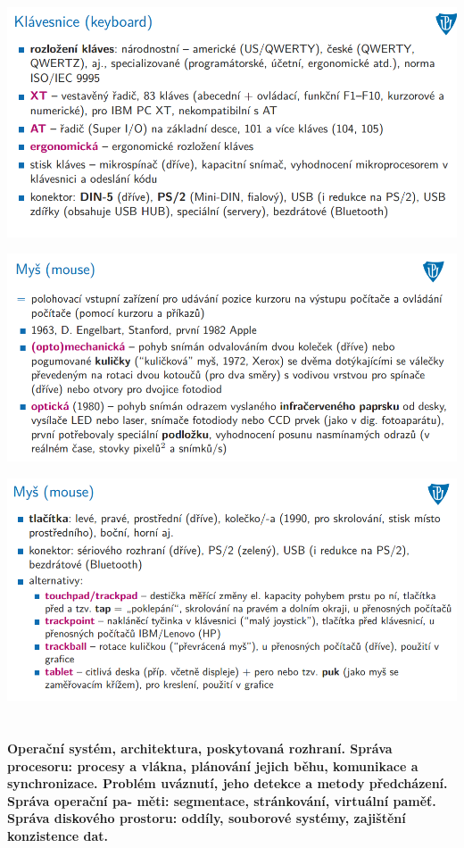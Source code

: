 \documentclass[10pt,a4paper]{article}
\begin{document}
\includegraphics[scale=0.65]{img/prvni_odstavec/otazka7/periferie9.png}

\includegraphics[scale=0.65]{img/prvni_odstavec/otazka7/periferie10.png}

\includegraphics[scale=0.65]{img/prvni_odstavec/otazka7/periferie11.png}


\clearpage
\section{}
\paragraph{Operační systém, architektura, poskytovaná rozhraní. Správa procesoru: procesy a vlákna, plánování jejich
běhu, komunikace a synchronizace. Problém uváznutí, jeho detekce a metody předcházení. Správa operační pa-
měti: segmentace, stránkování, virtuální paměť. Správa diskového prostoru: oddíly, souborové systémy, zajištění
konzistence dat.}
\end{document}
